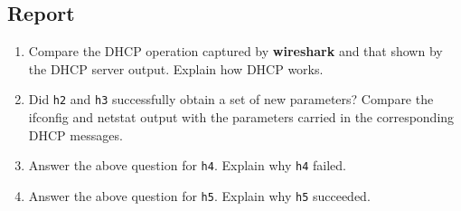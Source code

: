 \documentclass{../UTNetLab}
\begin{document}
    \subsection*{Report}
    \begin{enumerate}
        \item Compare the DHCP operation captured by \textbf{wireshark} and that shown by the DHCP server output.
        Explain how DHCP works.
        \item Did \texttt{h2} and \texttt{h3} successfully obtain a set of new parameters?
        Compare the ifconfig and netstat output with the parameters carried in the corresponding DHCP messages.
        \item Answer the above question for \texttt{h4}.
        Explain why \texttt{h4} failed.
        \item Answer the above question for \texttt{h5}.
        Explain why \texttt{h5} succeeded.
    \end{enumerate}
\end{document}
